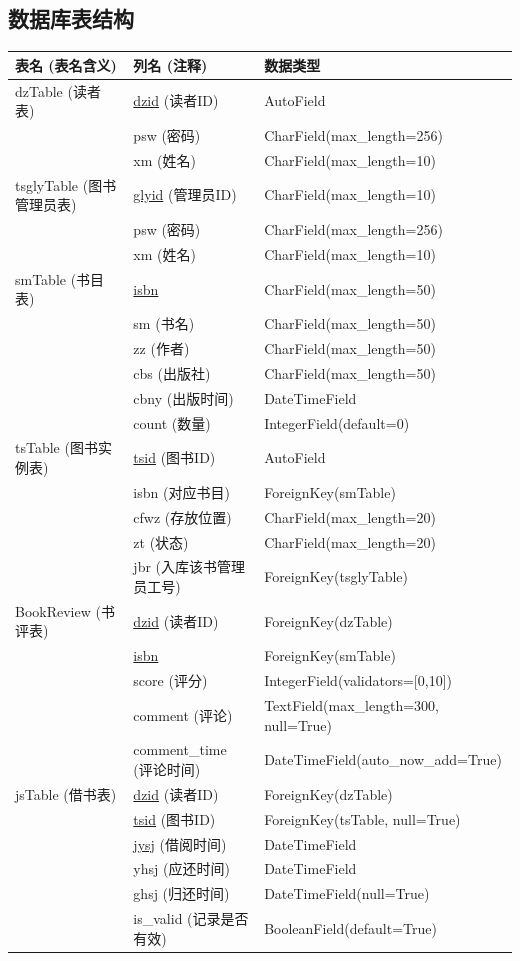 \documentclass{ctexart}
\begin{document}
	\subsection{数据库表结构}
	\begin{longtable}{p{3.5cm}p{3.5cm}p{5.5cm}}
		\toprule
		\textbf{表名 (表名含义)} & \textbf{列名 (注释)} & \textbf{数据类型} \\
		\midrule
		\endhead
		dzTable (读者表) & \underline{dzid} (读者ID) & AutoField \\
		& psw (密码) & CharField(max\_length=256) \\
		& xm (姓名) & CharField(max\_length=10) \\
		\midrule
		tsglyTable (图书管理员表) & \underline{glyid} (管理员ID) & CharField(max\_length=10) \\
		& psw (密码) & CharField(max\_length=256) \\
		& xm (姓名) & CharField(max\_length=10) \\
		\midrule
		smTable (书目表) & \underline{isbn} & CharField(max\_length=50) \\
		& sm (书名) & CharField(max\_length=50) \\
		& zz (作者) & CharField(max\_length=50) \\
		& cbs (出版社) & CharField(max\_length=50) \\
		& cbny (出版时间) & DateTimeField \\
		& count (数量) & IntegerField(default=0) \\
		\midrule
		tsTable (图书实例表) & \underline{tsid} (图书ID) & AutoField \\
		& isbn (对应书目) & ForeignKey(smTable) \\
		& cfwz (存放位置) & CharField(max\_length=20) \\
		& zt (状态) & CharField(max\_length=20) \\
		& jbr (入库该书管理员工号) & ForeignKey(tsglyTable) \\
		\midrule
		BookReview (书评表) & \underline{dzid} (读者ID) & ForeignKey(dzTable) \\
		& \underline{isbn}& ForeignKey(smTable) \\
		& score (评分) & IntegerField(validators=[0,10]) \\
		& comment (评论) & TextField(max\_length=300, null=True) \\
		& comment\_time (评论时间) & DateTimeField(auto\_now\_add=True) \\
		\midrule
		jsTable (借书表) & \underline{dzid} (读者ID) & ForeignKey(dzTable) \\
		& \underline{tsid} (图书ID) & ForeignKey(tsTable, null=True) \\
		& \underline{jysj} (借阅时间) & DateTimeField \\
		& yhsj (应还时间) & DateTimeField \\
		& ghsj (归还时间) & DateTimeField(null=True) \\
		& is\_valid (记录是否有效) & BooleanField(default=True) \\
		\bottomrule
		\end{longtable}
\end{document}
